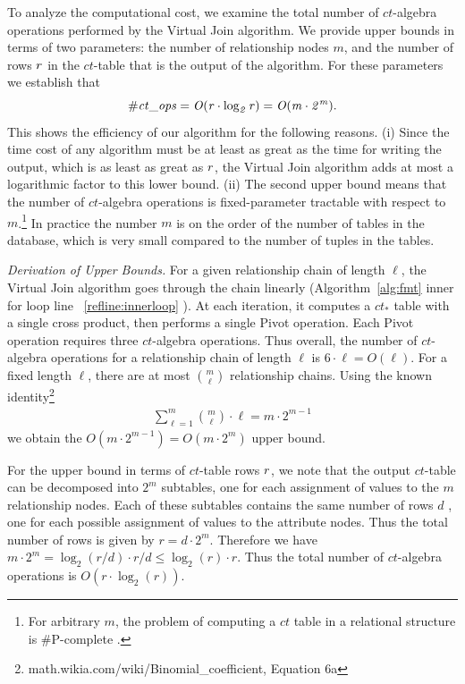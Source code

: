 \documentclass{vldb}
\newcommand{\ct}{\mathit{ct}}
\begin{document}
To  analyze the computational cost, we examine the total number of $\ct$-algebra operations performed by the Virtual Join algorithm. 
%
We provide  upper bounds in terms of two parameters: the number of relationship nodes  $m$, and  the number of rows $r$  in the $\ct$-table that is the output of the algorithm. 
For these parameters we establish that
$$\it{\# \ct\_\it{ops}} = O(r \cdot \log_{2} r) = O(m \cdot 2^{m}) .$$
This shows the efficiency of our algorithm for the following reasons.
(i) Since the time cost of any algorithm must be at least as great as the time for writing the output, which is as least as great as $r$, 
the Virtual Join algorithm adds at most a logarithmic factor to this lower bound. 
(ii)  The second upper bound means that the number of $\ct$-algebra operations is fixed-parameter tractable with respect to $m$.\footnote{For arbitrary $m$, the problem of computing a $\ct$ table in a relational structure is \#P-complete \cite[Prop.12.4]{Domingos2007}.} In practice the number $m$ is on the order of the number of tables in the database, 
which is very small compared to the number of tuples in the tables.

\emph{Derivation of Upper Bounds.}
For a given relationship chain of length $\ell$, the Virtual Join algorithm goes through the chain linearly (Algorithm~\ref{alg:fmt} inner for loop line ~\ref {reﬂine:innerloop}%
). 
At each iteration, it computes a $\ct_{*}$ table with a single cross product, then performs a single Pivot operation.
 Each Pivot operation requires three  $\ct$-algebra operations. 
Thus overall, the number of  $\ct$-algebra operations for a relationship chain of length $\ell$ is $6 \cdot \ell = O(\ell)$. For a fixed length $\ell$, there are at most $\binom{m}{\ell}$ relationship chains. Using the known identity\footnote{math.wikia.com/wiki/Binomial\_coefficient, Equation 6a}
\begin{align} 
\sum_{\ell=1}^{m} {m\choose \ell} \cdot \ell = m \cdot  2^{m-1} \label{eq:upperbound}
\end{align}
we obtain the $O(m \cdot  2^{m-1}) = O(m \cdot  2^{m})$ upper bound.%

For the upper bound in terms of $\ct$-table rows $r$, we note that the output $\ct$-table can be decomposed into $2^{m}$ subtables, one for each assignment of values to the $m$ relationship nodes. 
Each of these subtables contains the same number of rows $d$ , one for each possible assignment of values to the attribute nodes. 
Thus the total number of rows is given by $r = d \cdot 2^m.$ 
Therefore we have 
$m \cdot 2^{m} = \log_{2} (r/d) \cdot r/d \leq \log_{2}(r) \cdot r.$
Thus the total number of $\ct$-algebra operations is $O(r \cdot \log_{2}(r))$.
\end{document}
